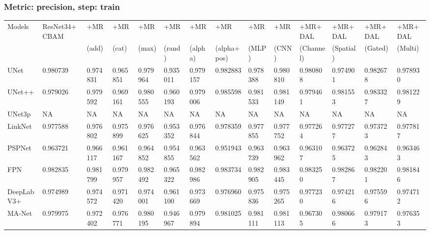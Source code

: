 \documentclass{article}
\begin{document}
\subsubsection{Metric: precision, step: train}
\begin{tabular}{llllllllllllll}
\toprule
Models & ResNet34+CBAM & +MR  & +MR  & +MR  & +MR  & +MR  & +MR  & +MR  & +MR  & +MR+DAL & +MR+DAL & +MR+DAL & +MR+DAL \\
       &             &  (add) &  (cat) &  (max) &  (rand) &  (alpha) &  (alpha+pos) &  (MLP) &  (CNN) & (Channel) & (Spatial) & (Gated) & (Multi) \\
\midrule
UNet & 0.980739 & 0.974831 & 0.965851 & 0.979964 & 0.935011 & 0.979157 & 0.982883 & 0.978388 & 0.980810 & 0.980808 & 0.974901 & 0.982678 & 0.978930 \\
UNet++ & 0.979026 & 0.979592 & 0.969161 & 0.980555 & 0.960193 & 0.979006 & 0.985598 & 0.981533 & 0.981149 & 0.979461 & 0.981553 & 0.983327 & 0.981229 \\
UNet3p & NA & NA & NA & NA & NA & NA & NA & NA & NA & NA & NA & NA & NA \\
LinkNet & 0.977588 & 0.976802 & 0.975899 & 0.976625 & 0.953352 & 0.976844 & 0.978359 & 0.977855 & 0.977752 & 0.977264 & 0.977277 & 0.973723 & 0.977817 \\
PSPNet & 0.963721 & 0.966117 & 0.961167 & 0.964852 & 0.954855 & 0.963562 & 0.951943 & 0.963739 & 0.963962 & 0.963107 & 0.963725 & 0.962843 & 0.963463 \\
FPN & 0.982835 & 0.981799 & 0.979957 & 0.982492 & 0.965322 & 0.982986 & 0.983734 & 0.982905 & 0.983445 & 0.983250 & 0.982867 & 0.982201 & 0.981846 \\
DeepLabV3+ & 0.974989 & 0.974572 & 0.971420 & 0.974001 & 0.961100 & 0.973669 & 0.976960 & 0.975836 & 0.975265 & 0.977230 & 0.974216 & 0.975596 & 0.974712 \\
MA-Net & 0.979975 & 0.972402 & 0.976771 & 0.980195 & 0.946967 & 0.979894 & 0.981025 & 0.981111 & 0.981113 & 0.967305 & 0.980666 & 0.979173 & 0.976353 \\
\bottomrule
\end{tabular}
\end{document}
